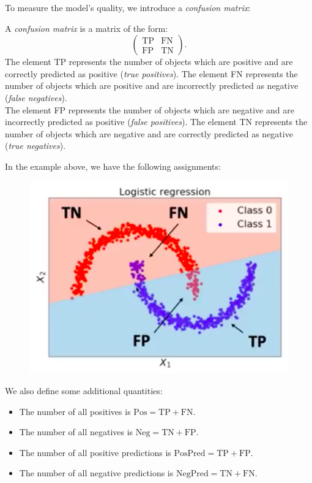To measure the model's quality, we introduce a \textit{confusion matrix}:

\begin{framedef}
A \textit{confusion matrix} is a matrix of the form:
\begin{equation*}
\begin{pmatrix} \text{TP} & \text{FN} \\ \text{FP} & \text{TN} \end{pmatrix}.
\end{equation*}
The element TP represents the number of objects which are positive and are correctly predicted as positive (\textit{true positives}). The element FN represents the number of objects which are positive and are incorrectly predicted as negative (\textit{false negatives}).\\

The element FP represents the number of objects which are negative and are incorrectly predicted as positive (\textit{false positives}). The element TN represents the number of objects which are negative and are correctly predicted as negative (\textit{true negatives}).


\newpage
In the example above, we have the following assignments:
\begin{figure}[H]
\centering
\includegraphics[scale=0.4]{confusionmatrix.png}
\end{figure}
We also define some additional quantities:
\begin{itemize}
\item The number of all positives is $\text{Pos} = \text{TP} + \text{FN}$.
\item The number of all negatives is $\text{Neg} = \text{TN} + \text{FP}$.
\item The number of all positive predictions is $\text{PosPred} = \text{TP} + \text{FP}$.
\item The number of all negative predictions is $\text{NegPred} = \text{TN} + \text{FN}$.
\end{itemize}
\end{framedef}

